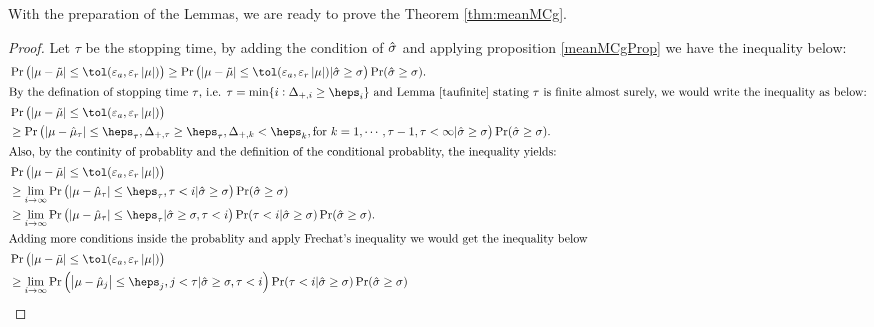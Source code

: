 \documentclass{iitthesis}
\newtheorem{lemma}[theorem]{Lemma}
\begin{document}
With the preparation of the Lemmas, we are ready to prove the Theorem \ref{thm:meanMCg}.
\begin{proof}
Let $\tau$ be the stopping time, by adding the condition of $\hat{\sigma}$ and applying proposition \ref{meanMCgProp} we have the inequality below:
\begin{align*}
&\Pr\left (\abs{\mu-\tmu} \leq \tol(\varepsilon_a, \varepsilon_r \abs{\mu})\right) \geq\Pr\left(\abs{\mu-\tmu} \leq \tol(\varepsilon_a, \varepsilon_r \abs{\mu})|\hsigma\geq \sigma\right) \Pr(\hsigma\geq \sigma).\\
\intertext{By the defination of stopping time $\tau$, i.e. $\tau = \min\{ i: \Delta_{+,i} \geq \heps_i \}$ and Lemma \ref{taufinite} stating $\tau$ is finite almost surely, we would write the inequality as below:}
&\Pr\left (\abs{\mu-\tmu} \leq \tol(\varepsilon_a, \varepsilon_r \abs{\mu})\right)\\ &\geq \Pr\left(\abs{\mu-\hmu_\tau}\leq \heps_\tau,  \Delta_{+,\tau} \geq \heps_{\tau}, \Delta_{+,k} < \heps_{k}, \text{for } k = 1,\cdots,\tau-1, \tau<\infty|\hsigma\geq \sigma\right)\Pr(\hsigma\geq \sigma).\\
\intertext{Also, by the continity of probablity and the definition of the conditional probablity, the inequality yields: }
&\Pr\left (\abs{\mu-\tmu} \leq \tol(\varepsilon_a, \varepsilon_r \abs{\mu})\right) \\
& \geq \lim_{i\to \infty} \Pr\left(\abs{\mu-\hmu_\tau}\leq \heps_\tau, \tau<i|\hsigma\geq \sigma\right)\Pr(\hsigma\geq \sigma)\\
& \geq \lim_{i\to \infty}\Pr\left(\abs{\mu-\hmu_\tau}\leq \heps_\tau | \hsigma \geq \sigma, \tau <i\right)\Pr(\tau<i|\hsigma\geq\sigma)\Pr(\hsigma\geq \sigma).\\
\intertext{Adding more conditions inside the probablity and apply Frechat's inequality we would get the inequality below}
&\Pr\left (\abs{\mu-\tmu} \leq \tol(\varepsilon_a, \varepsilon_r \abs{\mu})\right) \\
&\geq\lim_{i\to \infty} \Pr\left(\abs{\mu-\hmu_j}\leq \heps_j, j< \tau|\hsigma \geq \sigma ,\tau < i\right)\Pr(\tau< i|\hsigma \geq \sigma)\Pr(\hsigma\geq \sigma)\\

\end{align*}
\end{proof}
\end{document}

